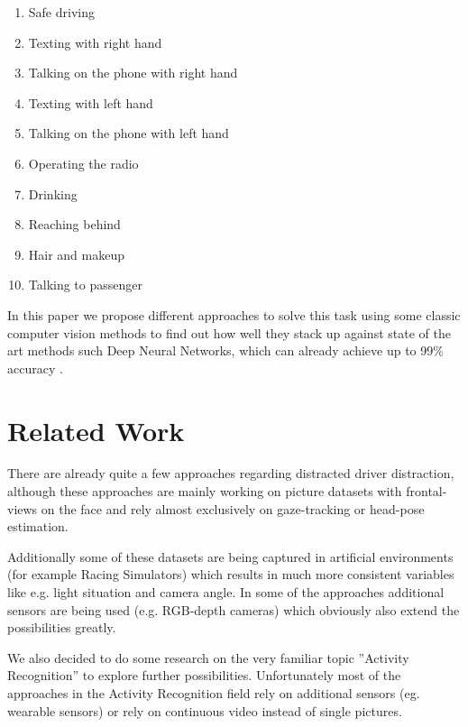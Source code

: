\documentclass[10pt,twocolumn,letterpaper]{article}
\begin{document}
\begin{enumerate}
	\item Safe driving
	\item Texting with right hand
	\item Talking on the phone with right hand
	\item Texting with left hand
	\item Talking on the phone with left hand
	\item Operating the radio
	\item Drinking
	\item Reaching behind
	\item Hair and makeup
	\item Talking to passenger
\end{enumerate}

In this paper we propose different approaches to solve this task using some classic computer vision methods to find out how well they stack up against state of the art methods such Deep Neural Networks, which can already achieve up to 99\% accuracy .



\section{Related Work}

There are already quite a few approaches regarding distracted driver distraction, although these approaches are mainly working on picture datasets with frontal-views on the face and rely almost exclusively on gaze-tracking or head-pose estimation. \cite{Dorazio} \cite{6957817}

Additionally some of these datasets are being captured in artificial environments (for example Racing Simulators) \cite{itsc:bergasa2008} which results in much more consistent variables like e.g. light situation and camera angle. In some of the approaches additional sensors are being used (e.g. RGB-depth cameras) which obviously also extend the possibilities greatly. \cite{Ragab2014}

We also decided to do some research on the very familiar topic ''Activity Recognition'' to explore further possibilities. Unfortunately most of the approaches in the Activity Recognition field rely on additional sensors (eg. wearable sensors) \cite{6258525} \cite{6365160} or rely on continuous video instead of single pictures. \cite{1315249} \cite{1430826}
\end{document}
